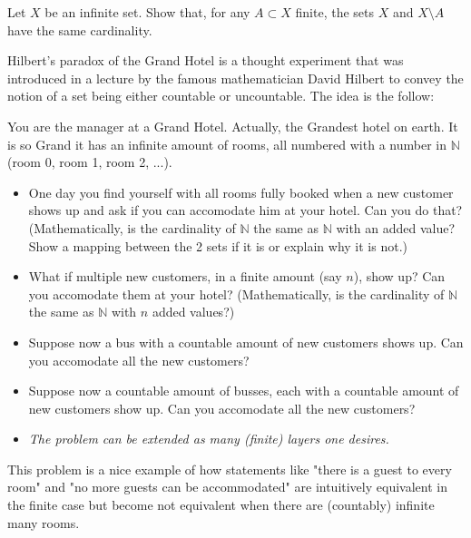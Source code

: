 \documentclass[11pt]{article}%
\begin{document}
\begin{Exercise}[title=**]
	Let $X$ be an infinite set. Show that, for any $A\subset X$ finite, the sets $X$ and $X\setminus A$ have the same cardinality. 
\end{Exercise}

\begin{Exercise}[title=\text{**$\dagger$ - Hilbert's Hotel}]
	Hilbert's paradox of the Grand Hotel is a thought experiment that was introduced in a lecture by the famous mathematician David Hilbert to convey the notion of a set being either countable or uncountable. The idea is the follow:
	
	You are the manager at a Grand Hotel. Actually, the Grandest hotel on earth. It is so Grand it has an infinite amount of rooms, all numbered with a number in $\mathbb N$ (room 0, room 1, room 2, ...). 
	
	\begin{itemize}
		\item One day you find yourself with all rooms fully booked when a new customer shows up and ask if you can accomodate him at your hotel. Can you do that? (Mathematically, is the cardinality of $\mathbb N$ the same as $\mathbb N$ with an added value? Show a mapping between the 2 sets if it is or explain why it is not.)
		
		\item What if multiple new customers, in a finite amount (say $n$), show up? Can you accomodate them at your hotel? (Mathematically, is the cardinality of $\mathbb N$ the same as $\mathbb N$ with $n$ added values?)
		
		\item Suppose now a bus with a countable amount of new customers shows up. Can you accomodate all the new customers?
		
		\item Suppose now a countable amount of busses, each with a countable amount of new customers show up. Can you accomodate all the new customers?
		
		\item \textit{The problem can be extended as many (finite) layers one desires. }
		
	\end{itemize}
	This problem is a nice example of how statements like "there is a guest to every room" and "no more guests can be accommodated" are intuitively equivalent in the finite case but become not equivalent when there are (countably) infinite many rooms. 
	
\end{Exercise}
\end{document}
